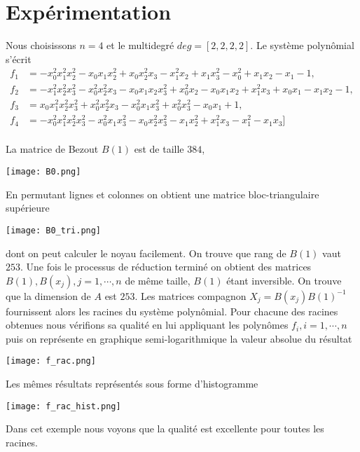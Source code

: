 \documentclass{standalone}
\begin{document}
  \section{Expérimentation}
  Nous choisissons $n=4$ et le multidegré $deg=[2,2,2,2]$. Le système polynômial s'écrit
  \begin{align}
  f_1 & =
  -x_0^2x_1^2x_2^2 - x_0x_1x_2^2 + x_0x_2^2x_3 - x_1^2x_2 + x_1x_3^2 - x_0^2 + x_1x_2 - x_1 - 1, \nonumber\\
  f_2 & =
   -x_1^2x_2^2x_3^2 - x_0^2x_2^2x_3 - x_0x_1x_2x_3^2 + x_0^2x_2 - x_0x_1x_2 + x_1^2x_3 + x_0x_1 - x_1x_2 - 1, \nonumber\\
   f_3 & =
   x_0x_1^2x_2^2x_3^2 + x_0^2x_2^2x_3 - x_0^2x_1x_3^2 + x_0^2x_3^2 - x_0x_1 + 1, \nonumber\\
   f_4 & =
   -x_0^2x_1^2x_2^2x_3^2 - x_0^2x_1x_3^2 - x_0x_2^2x_3^2 - x_1x_2^2 + x_1^2x_3 - x_1^2 - x_1x_3] \nonumber\\
   \end{align}

  La matrice de Bezout $B(1)$ est de taille $384$,
   \begin{center}
  \texttt{[image: B0.png]}
  \end{center}


  En permutant lignes et colonnes on obtient une matrice bloc-triangulaire supérieure
   \begin{center}
  \texttt{[image: B0\_tri.png]}
  \end{center}
  dont on peut calculer le noyau facilement. On trouve que rang de $B(1)$ vaut $253$.
  Une fois le processus de réduction terminé on obtient des matrices $B(1), B(x_j), j=1,\cdots,n$ de même taille, $B(1)$ étant inversible. On trouve que la dimension de $A$ est $253$. Les matrices compagnon $X_j = B(x_j)B(1)^{-1}$ fournissent alors les racines du système polynômial. Pour chacune des racines obtenues nous vérifions sa qualité en lui appliquant les polynômes $f_i, i=1,\cdots,n$ puis on représente en graphique semi-logarithmique la  valeur absolue du résultat
   \begin{center}
  \texttt{[image: f\_rac.png]}
  \end{center}
  Les mêmes résultats représentés sous forme d'histogramme
   \begin{center}
  \texttt{[image: f\_rac\_hist.png]}
  \end{center}

  Dans cet exemple nous voyons que la qualité est excellente pour toutes les racines.
\end{document}
